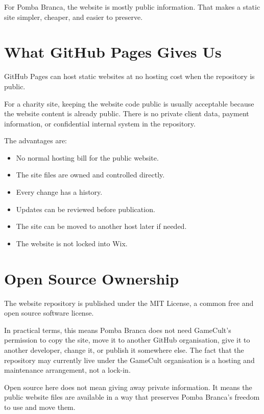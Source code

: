 \documentclass[10pt]{article}
\newcommand{\sectionrule}{\vspace{-0.45em}{\color{PombaBlue}\hrule height 0.8pt}\vspace{0.55em}}
\begin{document}
For Pomba Branca, the website is mostly public information. That makes a static site simpler, cheaper, and easier to preserve.

\section*{What GitHub Pages Gives Us}
\sectionrule

GitHub Pages can host static websites at no hosting cost when the repository is public.

For a charity site, keeping the website code public is usually acceptable because the website content is already public. There is no private client data, payment information, or confidential internal system in the repository.

The advantages are:

\begin{itemize}
  \item No normal hosting bill for the public website.
  \item The site files are owned and controlled directly.
  \item Every change has a history.
  \item Updates can be reviewed before publication.
  \item The site can be moved to another host later if needed.
  \item The website is not locked into Wix.
\end{itemize}

\clearpage

\section*{Open Source Ownership}
\sectionrule

The website repository is published under the MIT License, a common free and open source software license.

In practical terms, this means Pomba Branca does not need GameCult's permission to copy the site, move it to another GitHub organisation, give it to another developer, change it, or publish it somewhere else. The fact that the repository may currently live under the GameCult organisation is a hosting and maintenance arrangement, not a lock-in.

Open source here does not mean giving away private information. It means the public website files are available in a way that preserves Pomba Branca's freedom to use and move them.
\end{document}
